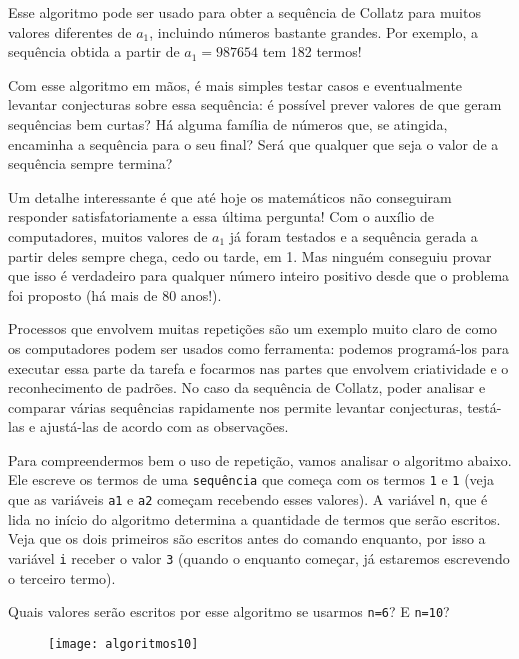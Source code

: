 Esse algoritmo pode ser usado para obter a sequência de Collatz para muitos valores diferentes de $a_1$, incluindo números bastante grandes. Por exemplo, a sequência obtida a partir de $a_1=987654$ tem 182 termos!

Com esse algoritmo em mãos, é mais simples testar casos e eventualmente levantar conjecturas sobre essa sequência: é possível prever valores de  que geram sequências bem curtas? Há alguma família de números que, se atingida, encaminha a sequência para o seu final? Será que qualquer que seja o valor de  a sequência sempre termina?

Um detalhe interessante é que até hoje os matemáticos não conseguiram responder satisfatoriamente a essa última pergunta! Com o auxílio de computadores, muitos valores de $a_1$ já foram testados e a sequência gerada a partir deles sempre chega, cedo ou tarde, em 1. Mas ninguém conseguiu provar que isso é verdadeiro para qualquer número inteiro positivo desde que o problema foi proposto (há mais de 80 anos!).

\label{comp-arr5}

Processos que envolvem muitas repetições são um exemplo muito claro de como os computadores podem ser usados como ferramenta: podemos programá-los para executar essa parte da tarefa e focarmos nas partes que envolvem criatividade e o reconhecimento de padrões. No caso da sequência de Collatz, poder analisar e comparar várias sequências rapidamente nos permite levantar conjecturas, testá-las e ajustá-las de acordo com as observações.

Para compreendermos bem o uso de repetição, vamos analisar o algoritmo abaixo. Ele escreve os termos de uma \verb|sequência| que começa com os termos \verb|1| e \verb|1| (veja que as variáveis \verb|a1| e \verb|a2| começam recebendo esses valores). A variável \verb|n|, que é lida no início do algoritmo determina a quantidade de termos que serão escritos. Veja que os dois primeiros são escritos antes do comando enquanto, por isso a variável \verb|i| receber o valor \verb|3| (quando o enquanto começar, já estaremos escrevendo o terceiro termo).

Quais valores serão escritos por esse algoritmo se usarmos \verb|n=6|? E \verb|n=10|?

\begin{figure}[H]
\centering

\texttt{[image: algoritmos10]}
\end{figure}

